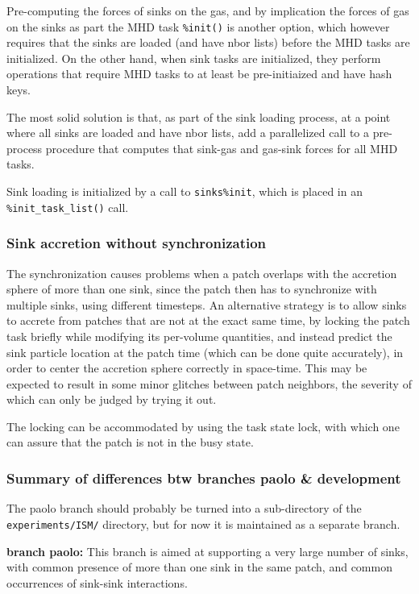 \documentclass[paper=a4,fontsize=11pt]{scrartcl}
\numberwithin{equation}{section}		%
\numberwithin{figure}{section}			%
\numberwithin{table}{section}				%
\begin{document}
Pre-computing the forces of sinks on the gas, and by implication the forces of gas on the sinks as part the MHD task \verb|%init()| is another option, which however requires that the sinks are loaded (and have nbor lists) before the MHD tasks are initialized.  On the other hand, when sink tasks are initialized, they perform operations that require MHD tasks to at least be pre-initiaized and have hash keys.

The most solid solution is that, as part of the sink loading process, at a point where all sinks are loaded and have nbor lists, add a parallelized call to a pre-process procedure that computes that sink-gas and gas-sink forces for all MHD tasks.

Sink loading is initialized by a call to \verb|sinks%init|, which is placed in an \verb|%init_task_list()| call.

\subsubsection{Sink accretion without synchronization}
The synchronization causes problems when a patch overlaps with the accretion sphere of more than one sink, since the patch then has to synchronize with multiple sinks, using different timesteps.  An alternative strategy is to allow sinks to accrete from patches that are not at the exact same time, by locking the patch task briefly while modifying its per-volume quantities, and instead predict the sink particle location at the patch time (which can be done quite accurately), in order to center the accretion sphere correctly in space-time.   This may be expected to result in some minor glitches between patch neighbors, the severity of which can only be judged by trying it out.

The locking can be accommodated by using the task state lock, with which one can assure that the patch is not in the busy state.

\subsubsection{Summary of differences btw branches paolo \& development}
The paolo branch should probably be turned into a sub-directory of the \verb|experiments/ISM/| directory, but for now it is maintained as a separate branch.

\textbf{branch paolo:}  This branch is aimed at supporting a very large number of sinks, with common presence of more than one sink in the same patch, and common occurrences of sink-sink interactions.
\end{document}
